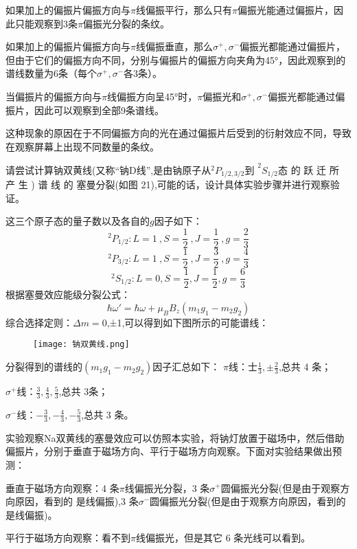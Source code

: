 \documentclass[dvipsnames, svgnames,a4paper,11pt]{article}
\begin{document}
如果加上的偏振片偏振方向与$\pi$线偏振平行，那么只有$\pi$偏振光能通过偏振片，因此只能观察到3条$\pi$偏振光分裂的条纹。

如果加上的偏振片偏振方向与$\pi$线偏振垂直，那么$\sigma^+,\sigma^-$偏振光都能通过偏振片，但由于它们的偏振方向不同，分别与偏振片的偏振方向夹角为45°，因此观察到的谱线数量为6条（每个$\sigma^+,\sigma^-$各3条）。

当偏振片的偏振方向与$\pi$线偏振方向呈45°时，$\pi$偏振光和$\sigma^+,\sigma^-$偏振光都能通过偏振片，因此可以观察到全部9条谱线。

这种现象的原因在于不同偏振方向的光在通过偏振片后受到的衍射效应不同，导致在观察屏幕上出现不同数量的条纹。







\begin{question}
	请尝试计算钠双黄线(又称“钠D线”,是由钠原子从$^2P_{1/ 2, 3/ 2}\text{到 }^2S_{1/ 2}$态 的 跃 迁 所 产 生 ) 谱 线 的 
	塞曼分裂(如图 21),可能的话，设计具体实验步骤并进行观察验证。
\end{question}
这三个原子态的量子数以及各自的$g$因子如下：
$$^2P_{1/2}\colon L=1\:,S=\frac{1}{2}\:,J=\frac{1}{2}\:,g=\frac{2}{3}$$$$^2P_{3/2}\colon L=1\:,S=\frac{1}{2}\:,J=\frac{3}{2}\:,g=\frac{4}{3}$$
$$^2S_{1/2}\colon L=0,S=\frac12,J=\frac12,g=\frac63$$
根据塞曼效应能级分裂公式：
$$\hbar\omega'=\hbar\omega+\mu_BB_z(m_1g_1-m_2g_2)$$
综合选择定则：$\Delta m=0$,±1,可以得到如下图所示的可能谱线：
\begin{figure}[{H}]
	\centering
	\texttt{[image: 钠双黄线.png]}
	
	\label{}
\end{figure}
分裂得到的谱线的$(m_1g_1-m_2g_2)$因子汇总如下：
$\pi$线：士$\frac13,\pm\frac23$,总共 4 条；

$\sigma^+$线：$\frac33,\frac43,\frac53$,总共 3条；

$\sigma^-$线：$-\frac33,-\frac43,-\frac53$,总共 3 条。

实验观察Na双黄线的塞曼效应可以仿照本实验，将钠灯放置于磁场中，然后借助偏振片，分别于垂直于磁场方向、平行于磁场方向观察。下面对实验结果做出预测：

垂直于磁场方向观察：4 条$\pi$线偏振光分裂，3 条$\sigma^+$圆偏振光分裂(但是由于观察方向原因，看到的
是线偏振),3 条$\sigma^-$圆偏振光分裂(但是由于观察方向原因，看到的是线偏振)。

平行于磁场方向观察：看不到$\pi$线偏振光，但是其它 6 条光线可以看到。

	\clearpage
	
\end{document}
